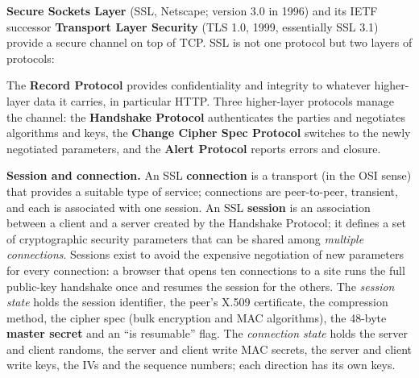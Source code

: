 \textbf{Secure Sockets Layer} (SSL, Netscape; version 3.0 in 1996) and its IETF successor \textbf{Transport Layer Security} (TLS 1.0, 1999, essentially SSL 3.1) provide a secure channel on top of TCP. SSL is not one protocol but two layers of protocols:
\begin{center}
\end{center}
The \textbf{Record Protocol} provides confidentiality and integrity to whatever higher-layer data it carries, in particular HTTP. Three higher-layer protocols manage the channel: the \textbf{Handshake Protocol} authenticates the parties and negotiates algorithms and keys, the \textbf{Change Cipher Spec Protocol} switches to the newly negotiated parameters, and the \textbf{Alert Protocol} reports errors and closure.

\textbf{Session and connection.} An SSL \textbf{connection} is a transport (in the OSI sense) that provides a suitable type of service; connections are peer-to-peer, transient, and each is associated with one session. An SSL \textbf{session} is an association between a client and a server created by the Handshake Protocol; it defines a set of cryptographic security parameters that can be shared among \emph{multiple connections}. Sessions exist to avoid the expensive negotiation of new parameters for every connection: a browser that opens ten connections to a site runs the full public-key handshake once and resumes the session for the others. The \emph{session state} holds the session identifier, the peer's X.509 certificate, the compression method, the cipher spec (bulk encryption and MAC algorithms), the 48-byte \textbf{master secret} and an ``is resumable'' flag. The \emph{connection state} holds the server and client randoms, the server and client write MAC secrets, the server and client write keys, the IVs and the sequence numbers; each direction has its own keys.

